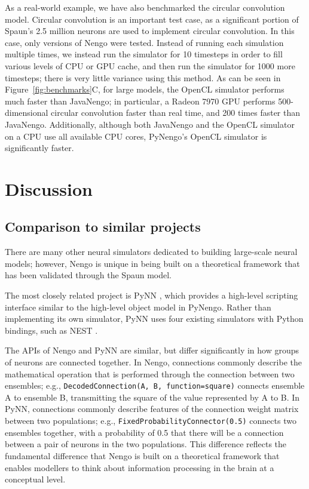 \documentclass{frontiersSCNS}
\begin{document}
As a real-world example,
we have also benchmarked
the circular convolution model.
Circular convolution is an important test case,
as a significant portion of Spaun's
2.5 million neurons are used to
implement circular convolution.
In this case, only versions of Nengo
were tested.
Instead of running each simulation multiple times,
we instead run the simulator for 10 timesteps
in order to fill various levels of CPU or GPU cache,
and then run the simulator for 1000 more timesteps;
there is very little variance using this method.
As can be seen in Figure~\ref{fig:benchmarks}C,
for large models, the OpenCL simulator
performs much faster than JavaNengo;
in particular, a Radeon 7970 GPU performs 500-dimensional
circular convolution faster than real time,
and 200 times faster than JavaNengo.
Additionally, although both JavaNengo
and the OpenCL simulator on a CPU
use all available CPU cores,
PyNengo's OpenCL simulator is significantly faster.

\section{Discussion}

\subsection{Comparison to similar projects}

There are many other neural simulators
dedicated to building large-scale neural models;
however, Nengo is unique in being built
on a theoretical framework
that has been validated
through the Spaun model.

The most closely related project is PyNN
\cite{TODO},
which provides a high-level scripting
interface similar to the
high-level object model in PyNengo.
Rather than implementing its
own simulator, PyNN uses four existing
simulators with Python bindings,
such as NEST \cite{TODO}.

The APIs of Nengo and PyNN are similar,
but differ significantly
in how groups of neurons are connected together.
In Nengo, connections commonly describe
the mathematical operation that is performed
through the connection between
two ensembles;
e.g., \texttt{DecodedConnection(A, B,
function=square)} connects ensemble A
to ensemble B, transmitting the square of
the value represented by A to B.
In PyNN, connections commonly describe
features of the connection weight matrix
between two populations;
e.g., \texttt{FixedProbabilityConnector(0.5)}
connects two ensembles together,
with a probability of 0.5
that there will be a connection
between a pair of neurons in the two populations.
This difference reflects the
fundamental difference that Nengo
is built on a theoretical framework
that enables modellers to think
about information processing in the brain
at a conceptual level.
\end{document}
